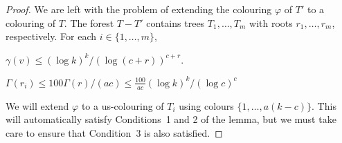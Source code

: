 \documentclass[kpfonts]{patmorin}
\begin{document}
\begin{proof}
    We are left with the problem of extending the colouring $\varphi$ of $T'$ to a colouring of $T$.  The forest $T-T'$ contains trees $T_1,\ldots,T_m$ with roots $r_1,\ldots,r_m$, respectively.  For each $i\in\{1,\ldots,m\}$,
    \begin{compactenum}
        \item $\gamma(v)\le (\log k)^k/(\log(c+r))^{c+r}$.
        \item $\Gamma(r_i) \le 100\Gamma(r)/(ac) \le \frac{100}{ac}(\log k)^k/(\log c)^c$
    \end{compactenum}
    We will extend $\varphi$ to a us-colouring of $T_i$ using colours $\{1,\ldots,a(k-c)\}$.  This will automatically satisfy Conditions~1 and 2 of the lemma, but we must take care to ensure that Condition~3 is also satisfied.


\end{proof}
\end{document}
